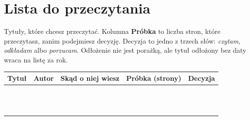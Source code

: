\section{Lista do przeczytania}
Tytuły, które chcesz przeczytać. Kolumna \textbf{Próbka} to liczba stron, które przeczytasz,
zanim podejmiesz decyzję. Decyzja to jedno z trzech słów: \emph{czytam}, \emph{odkładam} albo
\emph{porzucam}. Odłożenie nie jest porażką, ale tytuł odłożony bez daty wraca na listę za rok.

{\renewcommand{\arraystretch}{2.0}\small
\begin{longtable}{@{}p{3.4cm}p{2.5cm}p{3.2cm}p{2.0cm}p{2.8cm}@{}}
\toprule
\textsf{\textbf{Tytuł}} & \textsf{\textbf{Autor}} & \textsf{\textbf{Skąd o niej wiesz}} & \textsf{\textbf{Próbka (strony)}} & \textsf{\textbf{Decyzja}}\\
\midrule
\endhead
\bottomrule
\endfoot
& & & & \\
& & & & \\
& & & & \\
& & & & \\
& & & & \\
& & & & \\
& & & & \\
& & & & \\
& & & & \\
& & & & \\
& & & & \\
& & & & \\
\end{longtable}
}
